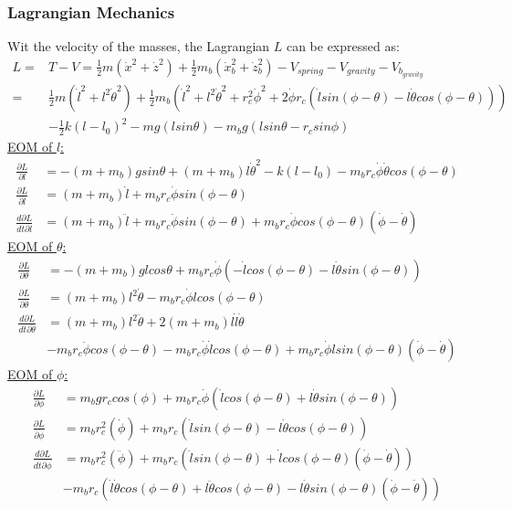 \subsubsection{Lagrangian Mechanics}
Wit the velocity of the masses, the Lagrangian $L$ can be expressed as:
\begin{align*}
L = & T-V = \frac{1}{2}m(\dot x^2+\dot z^2) + \frac{1}{2}m_b(\dot x_b^2+\dot z_b^2) - V_{spring} - V_{gravity}- V_{b_{gravity}}\\
 = &\frac{1}{2}m(\dot l^2 + l^2\dot \theta^2) +  
 \frac{1}{2}m_b(\dot l^2 + l^2\dot \theta^2 + r_c^2\dot\phi^2 + 2\dot{\phi}r_c(\dot lsin(\phi-\theta) - l\dot \theta cos(\phi-\theta))) \\ &-\frac{1}{2}k(l-l_0)^2-mg(lsin\theta)-m_bg(lsin\theta  -r_csin\phi)
\end{align*}
\noindent \underline{EOM of $l$:}
\begin{align*}
\frac{\partial L}{\partial l} &= -(m+m_b)gsin\theta+(m+m_b)l\dot\theta^2 - k(l-l_0) - m_br_c\dot\phi\dot\theta cos(\phi-\theta)\\
\frac{\partial L}{\partial \dot l} &= (m+m_b)\dot l + m_br_c\dot\phi sin(\phi-\theta)\\
\frac{d\partial L}{dt\partial \dot l} &= (m+m_b)\ddot l + m_br_c\ddot{\phi}sin(\phi-\theta) + m_br_c\dot{\phi}cos(\phi-\theta)(\dot\phi-\dot\theta)
\end{align*}
\noindent \underline{EOM of $\theta$:}
\begin{align*}
\frac{\partial L}{\partial \theta} &= -(m+m_b)glcos\theta +m_br_c\dot\phi(-\dot l cos(\phi-\theta)-l\dot \theta sin(\phi-\theta))\\
\frac{\partial L}{\partial \dot \theta} &= (m+m_b)l^2\dot{\theta} - m_br_c\dot{\phi}lcos(\phi-\theta)\\
\frac{d\partial L}{dt\partial \dot \theta} &= (m+m_b)l^2\ddot{\theta} + 2(m+m_b)l\dot l\dot \theta\\ &- m_br_c\ddot{\phi}cos(\phi-\theta) - m_br_c\dot{\phi}\dot lcos(\phi-\theta)+ m_br_c\dot{\phi}lsin(\phi-\theta)(
\dot\phi-\dot{\theta})
\end{align*}
\noindent \underline{EOM of $\phi$:}
\begin{align*}
\frac{\partial L}{\partial \phi} &=m_bgr_ccos(\phi) + m_br_c\dot{\phi}(\dot lcos(\phi-\theta) + l\dot{\theta}sin(\phi-\theta))\\
\frac{\partial L}{\partial \dot \phi} &= m_br_c^2(\dot{\phi}) + m_br_c(\dot lsin(\phi-\theta) - l\dot \theta cos(\phi-\theta))\\
\frac{d\partial L}{dt\partial \dot \phi} &= m_br_c^2(\ddot{\phi})+m_br_c(\ddot l sin(\phi-\theta) +\dot l cos(\phi-\theta)(\dot{\phi}-\dot{\theta}))\\
&-m_br_c(\dot l \dot{\theta}cos(\phi-\theta) + l \ddot{\theta}cos(\phi-\theta)  - l \dot{\theta}sin(\phi-\theta)(\dot{\phi}-\dot{\theta}))
\end{align*}
